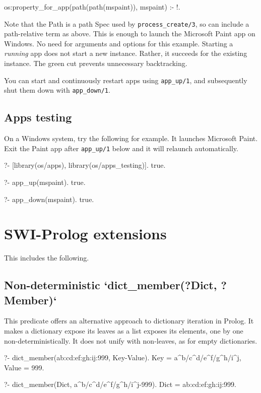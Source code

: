 \begin{code}
os:property_for_app(path(path(mspaint)), mspaint) :- !.
\end{code}

Note that the Path is a path Spec used by \verb$process_create/3$, so can include a
path-relative term as above. This is enough to launch the Microsoft Paint app on
Windows. No need for arguments and options for this example. Starting a \textit{running}
app does not start a new instance. Rather, it succeeds for the existing
instance. The green cut prevents unnecessary backtracking.

You can start and continuously restart apps using \verb$app_up/1$, and subsequently
shut them down with \verb$app_down/1$.

\subsection{Apps testing}

On a Windows system, try the following for example. It launches Microsoft Paint.
Exit the Paint app after \verb$app_up/1$ below and it will relaunch automatically.

\begin{code}
?- [library(os/apps), library(os/apps_testing)].
true.

?- app_up(mspaint).
true.

?- app_down(mspaint).
true.
\end{code}

\section{SWI-Prolog extensions}

This includes the following.

\subsection{Non-deterministic `dict_member(?Dict, ?Member)`}

This predicate offers an alternative approach to dictionary iteration in
Prolog. It makes a dictionary expose its leaves as a list exposes its
elements, one by one non-deterministically. It does not unify with
non-leaves, as for empty dictionaries.

\begin{code}
?- dict_member(a{b:c{d:e{f:g{h:i{j:999}}}}}, Key-Value).
Key = a^b/c^d/e^f/g^h/i^j,
Value = 999.

?- dict_member(Dict, a^b/c^d/e^f/g^h/i^j-999).
Dict = a{b:c{d:e{f:g{h:i{j:999}}}}}.
\end{code}

